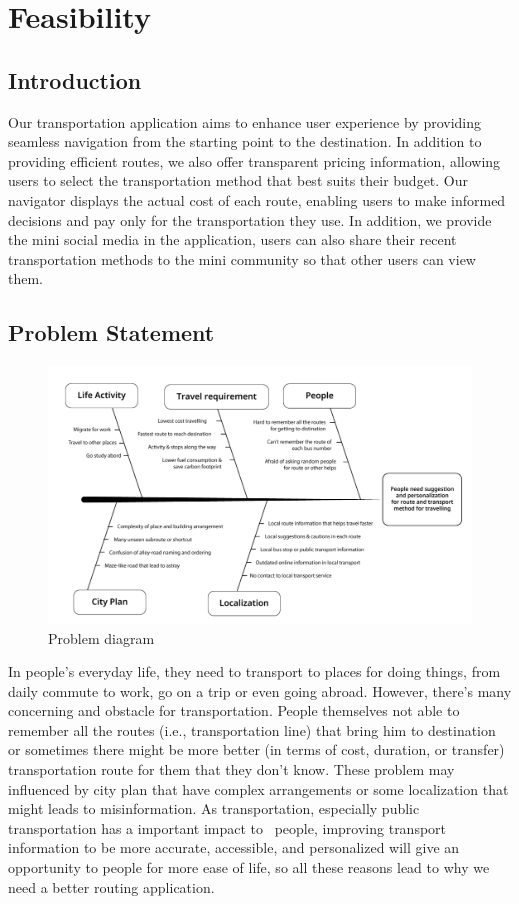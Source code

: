\chapter{Feasibility}
\section{Introduction}

\par
Our transportation application aims to enhance user experience by providing seamless navigation from the starting point to the destination. In addition to providing efficient routes, we also offer transparent pricing information, allowing users to select the transportation method that best suits their budget. Our navigator displays the actual cost of each route, enabling users to make informed decisions and pay only for the transportation they use. In addition, we provide the mini social media in the application, users can also share their recent transportation methods to the mini community so that other users can view them.
\section{Problem Statement}
\begin{figure}[!h]
    \centering
    \includegraphics[width=0.8\linewidth]{chapter2/problem-statement.png}
    \caption{Problem diagram}    
    \label{fig:Problem diagram}
\end{figure}
\par
In people's everyday life, they need to transport to places for doing things, from daily commute to work, go on a trip or even going abroad. However, there's many concerning and obstacle for transportation. People themselves not able to remember all the routes (i.e., transportation line) that bring him to destination or sometimes there might be more better (in terms of cost, duration, or transfer) transportation route for them that they don't know. These problem may influenced by city plan that have complex arrangements or some localization that might leads to misinformation. As transportation, especially public transportation has a important impact to  people, improving transport information to be more accurate, accessible, and personalized will give an opportunity to people for more ease of life, so all these reasons lead to why we need a better routing application.


